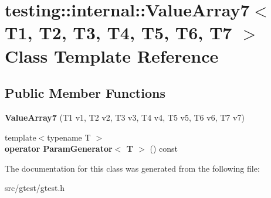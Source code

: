 \hypertarget{classtesting_1_1internal_1_1_value_array7}{}\section{testing\+:\+:internal\+:\+:Value\+Array7$<$ T1, T2, T3, T4, T5, T6, T7 $>$ Class Template Reference}
\label{classtesting_1_1internal_1_1_value_array7}
\subsection*{Public Member Functions}
\begin{DoxyCompactItemize}
\item 
\mbox{\label{classtesting_1_1internal_1_1_value_array7_a34570dbbcc50d20f94e4a0c693e42f09}} 
{\bfseries Value\+Array7} (T1 v1, T2 v2, T3 v3, T4 v4, T5 v5, T6 v6, T7 v7)
\item 
\mbox{\label{classtesting_1_1internal_1_1_value_array7_a4ab41f4a5687896e159c69f581d0a673}} 
{\footnotesize template$<$typename T $>$ }\\{\bfseries operator Param\+Generator$<$ T $>$} () const
\end{DoxyCompactItemize}


The documentation for this class was generated from the following file\+:\begin{DoxyCompactItemize}
\item 
src/gtest/gtest.\+h\end{DoxyCompactItemize}
